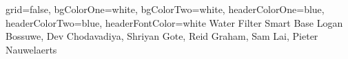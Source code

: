 \documentclass[portrait, a0paper]{baposter}
\begin{document}
\begin{poster} 
{
grid=false,
bgColorOne=white,
bgColorTwo=white,
headerColorOne=blue,
headerColorTwo=blue,
headerFontColor=white
}
{}
{Water Filter Smart Base}
{Logan Bossuwe, Dev Chodavadiya, Shriyan Gote, Reid Graham, Sam Lai, Pieter Nauwelaerts}
{}

\end{poster}
\end{document}
